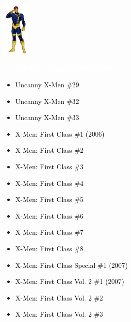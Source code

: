 \documentclass[12pt]{article}
\newcommand{\checkbox}{\raisebox{0.0ex}{\fbox{\rule{0ex}{1.5ex} \rule{1.5ex}{0ex}}}}
\begin{document}
\begin{center}
    \vspace*{2cm}
    \includegraphics[width=0.1\textwidth]{cyclops.png}
    \vspace{0.3cm}

    {\Huge \textbf{\textcolor{white}{X-Men Chronological Checklist}}}
\end{center}

\vspace{0.3cm}
\noindent
\begin{tcolorbox}[
  colback=white!95!gray,
  colframe=black,
  width=\textwidth,
  arc=4mm,
  auto outer arc,
  boxrule=0.8pt,
  left=8pt,right=8pt,top=8pt,bottom=8pt
]
\begin{itemize}[left=0pt,label={\checkbox}]
  \item \textcolor{black}{Uncanny X-Men \#29}
  \item \textcolor{black}{Uncanny X-Men \#32}
  \item \textcolor{black}{Uncanny X-Men \#33}
  \item \textcolor{black}{X-Men: First Class \#1 (2006)}
  \item \textcolor{black}{X-Men: First Class \#2}
  \item \textcolor{black}{X-Men: First Class \#3}
  \item \textcolor{black}{X-Men: First Class \#4}
  \item \textcolor{black}{X-Men: First Class \#5}
  \item \textcolor{black}{X-Men: First Class \#6}
  \item \textcolor{black}{X-Men: First Class \#7}
  \item \textcolor{black}{X-Men: First Class \#8}
  \item \textcolor{black}{X-Men: First Class Special \#1 (2007)}
  \item \textcolor{black}{X-Men: First Class Vol. 2 \#1 (2007)}
  \item \textcolor{black}{X-Men: First Class Vol. 2 \#2}
  \item \textcolor{black}{X-Men: First Class Vol. 2 \#3}
\end{itemize}
\end{tcolorbox}
\end{document}
